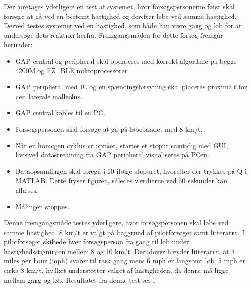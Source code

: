 Der foretages yderligere en test af systemet, hvor forsøgspersonerne først skal forsøge at gå ved en bestemt hastighed og derefter løbe ved samme hastighed. Derved testes systemet ved en hastighed, som både kan være gang og løb for at undersøge dets reaktion herfra. Fremgangsmåden for dette forsøg fremgår herunder:
\begin{itemize}
	\item GAP central og peripheral skal opdateres med korrekt algoritme på begge 4200M og EZ\_BLE mikroprocessorer.
	\item GAP peripheral med IC og en spændingsforsyning skal placeres proximalt for den laterale malleolus.
	\item GAP central kobles til en PC. 
	\item Forsøgspersonen skal forsøge at gå på løbebåndet med 8 km/t. 
	\item Når en homogen cyklus er opnået, startes et stopur samtidig med GUI, hvorved datastreaming fra GAP peripheral visualiseres på PCen.
	\item Dataopsamlingen skal foregå i 60 ifølge stopuret, hvorefter der trykkes på Q i MATLAB. Dette fryser figuren, således værdierne ved 60 sekunder kan aflæses.
	\item Målingen stoppes.
\end{itemize}
Denne fremgangsmåde testes yderligere, hvor forsøgspersonen skal løbe ved samme hastighed. 8 km/t er valgt på baggrund af pilotforsøget samt litteratur. I pilotforsøget skiftede hver forsøgsperson fra gang til løb under hastighedsstigningen mellem 8 og 10 km/t. Derudover hævder litteratur, at 4 miles per hour (mph) svarer til rask gang mens 6 mph er langsomt løb. 5 mph er cirka 8 km/t, hvilket understøtter valget af hastigheden, da denne må ligge mellem gang og løb. \citep{Miles2007} Resultatet fra denne test ses i 
